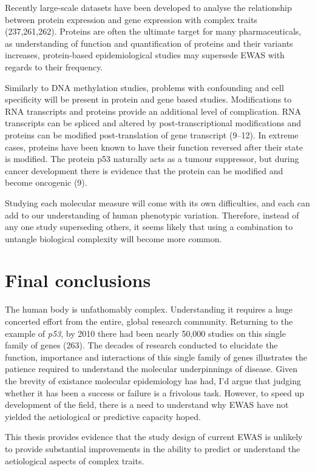 \documentclass[11pt,oneside]{bristolthesis}
\begin{document}
Recently large-scale datasets have been developed to analyse the relationship between protein expression and gene expression with complex traits (237,261,262). Proteins are often the ultimate target for many pharmaceuticals, as understanding of function and quantification of proteins and their variants increases, protein-based epidemiological studies may supersede EWAS with regards to their frequency.

Similarly to DNA methylation studies, problems with confounding and cell specificity will be present in protein and gene based studies. Modifications to RNA transcripts and proteins provide an additional level of complication. RNA transcripts can be spliced and altered by post-transcriptional modifications and proteins can be modified post-translation of gene transcript (9--12). In extreme cases, proteins have been known to have their function reversed after their state is modified. The protein p53 naturally acts as a tumour suppressor, but during cancer development there is evidence that the protein can be modified and become oncogenic (9).

Studying each molecular measure will come with its own difficulties, and each can add to our understanding of human phenotypic variation. Therefore, instead of any one study superseding others, it seems likely that using a combination to untangle biological complexity will become more common.

\hypertarget{final-conclusions}{%
\section{Final conclusions}\label{final-conclusions}}

The human body is unfathomably complex. Understanding it requires a huge concerted effort from the entire, global research community. Returning to the example of \emph{p53}, by 2010 there had been nearly 50,000 studies on this single family of genes (263). The decades of research conducted to elucidate the function, importance and interactions of this single family of genes illustrates the patience required to understand the molecular underpinnings of disease. Given the brevity of existance molecular epidemiology has had, I'd argue that judging whether it has been a success or failure is a frivolous task. However, to speed up development of the field, there is a need to understand why EWAS have not yielded the aetiological or predictive capacity hoped.

This thesis provides evidence that the study design of current EWAS is unlikely to provide substantial improvements in the ability to predict or understand the aetiological aspects of complex traits.
\end{document}
